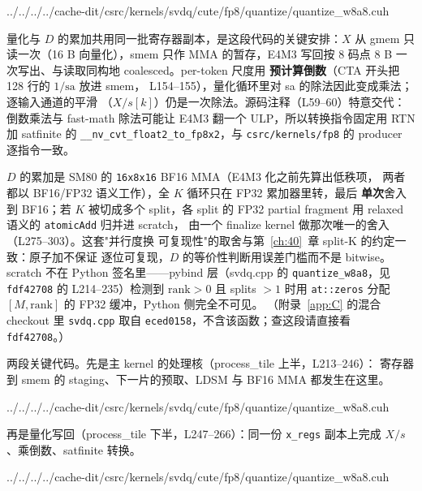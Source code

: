\begin{lstinputlisting}[linerange={96-125},firstnumber=auto,
  title={quantize\_w8a8.cuh L96--125（amax kernel：每行一 CTA 的 per-token 尺度）}]{../../../../cache-dit/csrc/kernels/svdq/cute/fp8/quantize/quantize_w8a8.cuh}
\end{lstinputlisting}

量化与 $D$ 的累加共用同一批寄存器副本，是这段代码的关键安排：$X$ 从
gmem 只读一次（16 B 向量化），smem 只作 MMA 的暂存，E4M3 写回按
8 码点 8 B 一次写出、与读取同构地 coalesced。per-token 尺度用
\textbf{预计算倒数}（CTA 开头把 128 行的 $1/\mathrm{sa}$ 放进 smem，
L154--155），量化循环里对 sa 的除法因此变成乘法；逐输入通道的平滑
（$X/s[k]$）仍是一次除法。源码注释（L59--60）特意交代：倒数乘法与
fast-math 除法可能让 E4M3 翻一个 ULP，所以转换指令固定用 RTN 加 satfinite 的
\texttt{\_\_nv\_cvt\_float2\_to\_fp8x2}，与 \texttt{csrc/kernels/fp8} 的
producer 逐指令一致。

$D$ 的累加是 SM80 的 \texttt{16x8x16} BF16 MMA（E4M3 化之前先算出低秩项，
两者都以 BF16/FP32 语义工作），全 $K$ 循环只在 FP32 累加器里转，最后
\textbf{单次}舍入到 BF16；若 $K$ 被切成多个 split，各 split 的 FP32
partial fragment 用 relaxed 语义的 \texttt{atomicAdd} 归并进 scratch，
由一个 finalize kernel 做那次唯一的舍入（L275--303）。这套"并行度换
可复现性"的取舍与第~\ref{ch:40}~章 split-K 的约定一致：原子加不保证
逐位可复现，$D$ 的等价性判断用误差门槛而不是 bitwise。scratch 不在
Python 签名里——pybind 层（svdq.cpp 的 \texttt{quantize\_w8a8}，见
\texttt{fdf42708} 的 L214--235）检测到 $\mathrm{rank}>0$ 且 splits $>1$ 时用
\texttt{at::zeros} 分配 $[M,\mathrm{rank}]$ 的 FP32 缓冲，Python 侧完全不可见。
（附录~\ref{app:C} 的混合 checkout 里 \texttt{svdq.cpp} 取自
\texttt{eced0158}，不含该函数；查这段请直接看 \texttt{fdf42708}。）

两段关键代码。先是主 kernel 的处理核（process\_tile 上半，L213--246）：
寄存器到 smem 的 staging、下一片的预取、LDSM 与 BF16 MMA 都发生在这里。

\begin{lstinputlisting}[linerange={213-246},firstnumber=auto,
  title={quantize\_w8a8.cuh L213--246（process\_tile 上段：ST smem、双缓冲预取与 $D$ 的 MMA）}]{../../../../cache-dit/csrc/kernels/svdq/cute/fp8/quantize/quantize_w8a8.cuh}
\end{lstinputlisting}

再是量化写回（process\_tile 下半，L247--266）：同一份
\texttt{x\_regs} 副本上完成 $X/s$、乘倒数、satfinite 转换。

\begin{lstinputlisting}[linerange={247-266},firstnumber=auto,
  title={quantize\_w8a8.cuh L247--266（process\_tile 下段：量化写回）}]{../../../../cache-dit/csrc/kernels/svdq/cute/fp8/quantize/quantize_w8a8.cuh}
\end{lstinputlisting}

